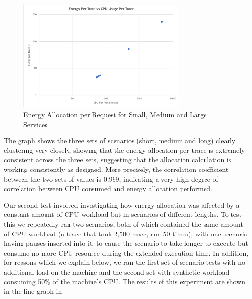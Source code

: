 \begin{figure}
\centering
\includegraphics[width=0.75\textwidth,trim={3 3 3 3},clip]{Figures/validation-energycpu}
\caption{Energy Allocation per Request for Small, Medium and Large Services}
\label{figure:validation-energycpu}
\end{figure}

The graph shows the three sets of scenarios (short, medium and long) clearly clustering very closely, showing that the energy allocation per trace is extremely consistent across the three sets, suggesting that the allocation calculation is working consistently as designed.  More precisely, the correlation coefficient between the two sets of values is 0.999, indicating a very high degree of correlation between CPU consumed and energy allocation performed.

Our second test involved investigating how energy allocation was affected by a constant amount of CPU workload but in scenarios of different lengths.  To test this we repeatedly ran two scenarios, both of which contained the same amount of CPU workload (a trace that took 2,500 msec, run 50 times), with one scenario having pauses inserted into it, to cause the scenario to take longer to execute but consume no more CPU resource during the extended execution time.  In addition, for reasons which we explain below, we ran the first set of scenario tests with no additional load on the machine and the second set with synthetic workload consuming 50\% of the machine's CPU.  The results of this experiment are shown in the line graph in 

